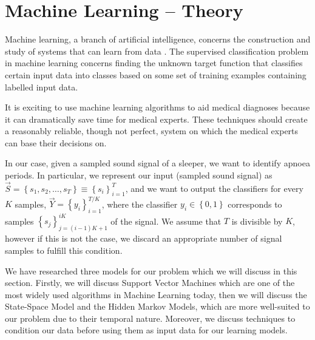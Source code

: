 \section{Machine Learning -- Theory}
\label{sec:mltheory-ta}
	Machine learning, a branch of artificial intelligence, concerns the construction and study of systems that can learn from data \cite{wiki:machineLearning}. The supervised classification problem in machine learning concerns finding the unknown target function that classifies certain input data into classes based on some set of training examples containing labelled input data.

	It is exciting to use machine learning algorithms to aid medical diagnoses because it can dramatically save time for medical experts. These techniques should create a reasonably reliable, though not perfect, system on which the medical experts can base their decisions on.
	
	In our case, given a sampled sound signal of a sleeper, we want to identify apnoea periods. In particular, we represent our input (sampled sound signal) as $\vec S = \left\{s_1, s_2, \dotsc, s_T \right\} \equiv \left\{ s_i \right\}_{i = 1}^{T}$, and we want to output the classifiers for every $K$ samples, $\vec Y = \left\{ y_i \right\}_{i = 1}^{T/K}$, where the classifier $y_i \in \left\{0, 1\right\}$ corresponds to samples $\left\{ s_j \right\}_{j = \left(i - 1\right)K + 1}^{iK}$ of the signal. We assume that $T$ is divisible by $K$, however if this is not the case, we discard an appropriate number of signal samples to fulfill this condition.

	We have researched three models for our problem which we will discuss in this section. Firstly, we will discuss Support Vector Machines which are one of the most widely used algorithms in Machine Learning today, then we will discuss the State-Space Model and the Hidden Markov Models, which are more well-suited to our problem due to their temporal nature. Moreover, we discuss techniques to condition our data before using them as input data for our learning models.
	



